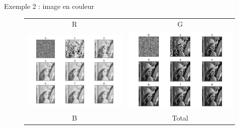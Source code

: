 \documentclass{beamer}
\begin{document}
\begin{frame}{Exemple 2 : image en couleur}
\begin{center}
\begin{figure}
\begin{tiny}
\begin{tabular}{cc}
R & G \\
\includegraphics[scale=0.23]{images/lena_128_4_8/lena_r.png} & 
\includegraphics[scale=0.23]{images/lena_128_4_8/lena_g.png} \\
B & Total \\

\end{tabular}
\end{tiny}
\end{figure}
\end{center}
\end{frame}
\end{document}
